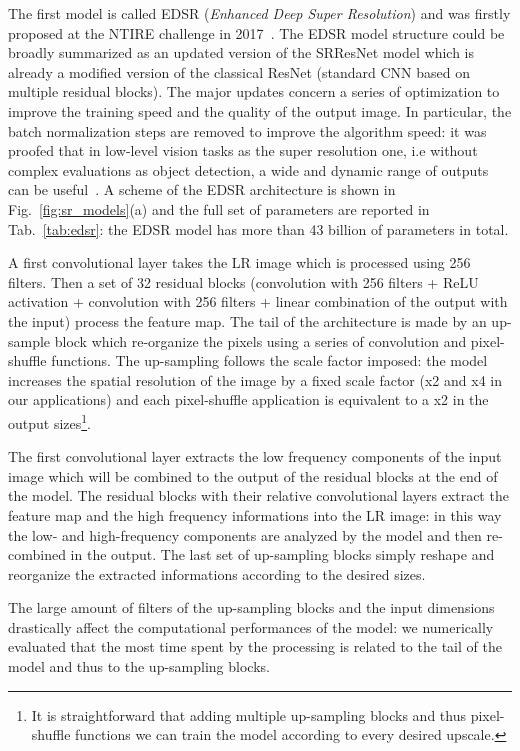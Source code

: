 \documentclass{standalone}
\begin{document}
The first model is called EDSR (\emph{Enhanced Deep Super Resolution}) and was firstly proposed at the NTIRE challenge in 2017~\cite{}.
The EDSR model structure could be broadly summarized as an updated version of the SRResNet model which is already a modified version of the classical ResNet (standard CNN based on multiple residual blocks).
The major updates concern a series of optimization to improve the training speed and the quality of the output image.
In particular, the batch normalization steps are removed to improve the algorithm speed: it was proofed that in low-level vision tasks as the super resolution one, i.e without complex evaluations as object detection, a wide and dynamic range of outputs can be useful~\cite{}.
A scheme of the EDSR architecture is shown in Fig.~\ref{fig:sr_models}(a) and the full set of parameters are reported in Tab.~\ref{tab:edsr}: the EDSR model has more than 43 billion of parameters in total.

A first convolutional layer takes the LR image which is processed using 256 filters.
Then a set of 32 residual blocks (convolution with 256 filters + ReLU activation + convolution with 256 filters + linear combination of the output with the input) process the feature map.
The tail of the architecture is made by an up-sample block which re-organize the pixels using a series of convolution and pixel-shuffle functions.
The up-sampling follows the scale factor imposed: the model increases the spatial resolution of the image by a fixed scale factor (x2 and x4 in our applications) and each pixel-shuffle application is equivalent to a x2 in the output sizes\footnote{
  It is straightforward that adding multiple up-sampling blocks and thus pixel-shuffle functions we can train the model according to every desired upscale.
}.

The first convolutional layer extracts the low frequency components of the input image which will be combined to the output of the residual blocks at the end of the model.
The residual blocks with their relative convolutional layers extract the feature map and the high frequency informations into the LR image: in this way the low- and high-frequency components are  analyzed by the model and then re-combined in the output.
The last set of up-sampling blocks simply reshape and reorganize the extracted informations according to the desired sizes.

The large amount of filters of the up-sampling blocks and the input dimensions drastically affect the computational performances of the model: we numerically evaluated that the most time spent by the processing is related to the tail of the model and thus to the up-sampling blocks.
\end{document}
